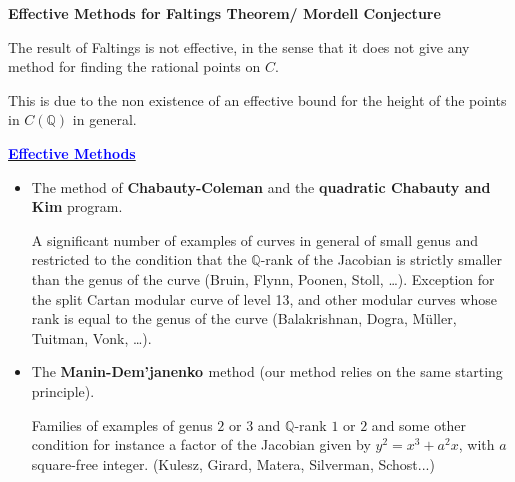 \documentclass[handout]{beamer}
\newcommand{\qe}{\mathbb{Q}}
\begin{document}
\begin{frame}{\bf Effective Methods for Faltings Theorem/ Mordell Conjecture}
\begin{alertblock}{}
The result of Faltings is not effective, in the sense that it does not give any method for finding the rational points on $C$.


This is due to the non existence of an effective bound for the height of the points in $C(\qe)$ in general.
\end{alertblock}
 \begin{tcolorbox}{\Large \underline{\bf \textcolor{blue}{Effective Methods}}}
\begin{itemize} 

\item The method of {\bf Chabauty-Coleman}  and the {\bf quadratic Chabauty and Kim} program.

A significant number of examples of curves in general of small genus and restricted to the condition that the $\mathbb{Q}$-rank  of the Jacobian is strictly smaller than the genus of the curve (Bruin, Flynn, Poonen, Stoll, \dots). Exception for the split Cartan modular curve of level 13, and other modular curves whose rank is equal to the genus of the curve (Balakrishnan, Dogra, M\"uller, Tuitman, Vonk, \dots). \\


\item  The {\bf  {Manin-Dem'janenko }}method (our method relies on the same starting principle).

Families of examples of genus $2$ or $3$ and $\qe$-rank $1$ or $2$ and some other condition for instance a factor of the Jacobian given by $y^2=x^3+a^2 x$, with $a$  square-free integer. (Kulesz, Girard, Matera, Silverman, Schost...)

\end{itemize}
\end{tcolorbox}
\end{frame}
\end{document}
